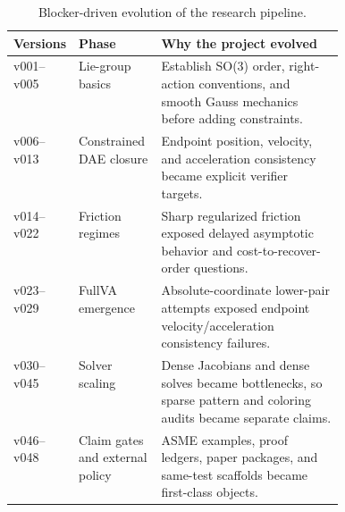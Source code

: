 \documentclass[10pt]{article}
\begin{document}
\begin{table}[H]
\centering
\caption{Blocker-driven evolution of the research pipeline.}
\label{tab:evolution}
\begin{tabularx}{\linewidth}{p{0.18\linewidth}p{0.25\linewidth}Y}
\toprule
\textbf{Versions} & \textbf{Phase} & \textbf{Why the project evolved} \\
\midrule
v001--v005 & Lie-group basics & Establish SO(3) order, right-action conventions, and smooth Gauss mechanics before adding constraints. \\
v006--v013 & Constrained DAE closure & Endpoint position, velocity, and acceleration consistency became explicit verifier targets. \\
v014--v022 & Friction regimes & Sharp regularized friction exposed delayed asymptotic behavior and cost-to-recover-order questions. \\
v023--v029 & FullVA emergence & Absolute-coordinate lower-pair attempts exposed endpoint velocity/acceleration consistency failures. \\
v030--v045 & Solver scaling & Dense Jacobians and dense solves became bottlenecks, so sparse pattern and coloring audits became separate claims. \\
v046--v048 & Claim gates and external policy & ASME examples, proof ledgers, paper packages, and same-test scaffolds became first-class objects. \\
\bottomrule
\end{tabularx}
\end{table}
\end{document}
